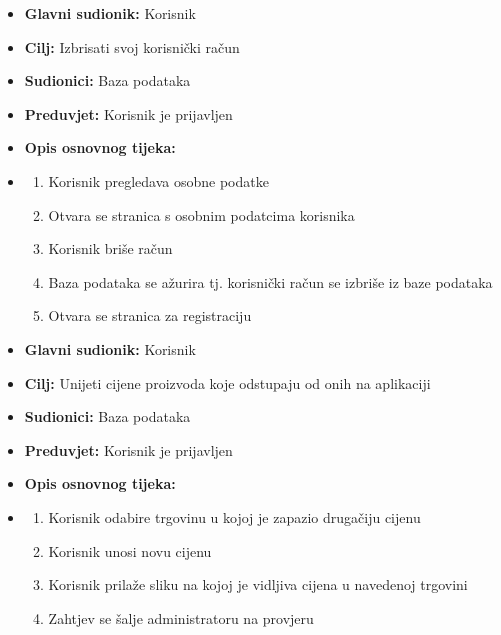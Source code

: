                         \noindent {}
					\begin{itemize}
	
						\item \textbf{Glavni sudionik: }Korisnik
						\item  \textbf{Cilj:} Izbrisati svoj korisnički račun
						\item  \textbf{Sudionici:} Baza podataka
						\item  \textbf{Preduvjet:} Korisnik je prijavljen
						\item  \textbf{Opis osnovnog tijeka:}
						
						\item[] \begin{enumerate}
							\item Korisnik pregledava osobne podatke
                                \item Otvara se stranica s osobnim podatcima korisnika
                                \item Korisnik briše račun
                                \item Baza podataka se ažurira tj. korisnički račun se izbriše iz baze podataka
                                \item Otvara se stranica za registraciju\\
						\end{enumerate}
						
					\end{itemize}

                        \noindent {}
					\begin{itemize}
	
						\item \textbf{Glavni sudionik: }Korisnik
						\item  \textbf{Cilj:} Unijeti cijene proizvoda koje odstupaju od onih na aplikaciji
						\item  \textbf{Sudionici:} Baza podataka
						\item  \textbf{Preduvjet:} Korisnik je prijavljen
						\item  \textbf{Opis osnovnog tijeka:}
						
						\item[] \begin{enumerate}
							\item Korisnik odabire trgovinu u kojoj je zapazio drugačiju cijenu
                                \item Korisnik unosi novu cijenu
                                \item Korisnik prilaže sliku na kojoj je vidljiva cijena u navedenoj trgovini
                                \item Zahtjev se šalje administratoru na provjeru\\
						\end{enumerate}
						
					\end{itemize}


